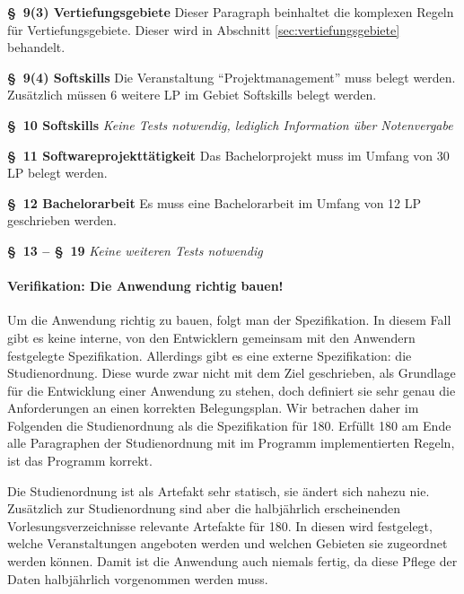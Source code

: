 \documentclass[ngerman]{article}
\begin{document}
\begin{paracol}{2}
\textbf{§~9(3) Vertiefungsgebiete}
\switchcolumn
Dieser Paragraph beinhaltet die komplexen Regeln für Vertiefungsgebiete.
Dieser wird in Abschnitt \ref{sec:vertiefungsgebiete} behandelt.
\\
\switchcolumn*

\textbf{§~9(4) Softskills}
\switchcolumn
Die Veranstaltung ``Projektmanagement'' muss belegt werden.
Zusätzlich müssen 6 weitere LP im Gebiet Softskills belegt werden.
\\
\switchcolumn*

\textbf{§~10 Softskills}
\switchcolumn
\emph{Keine Tests notwendig, lediglich Information über Notenvergabe}
\\
\switchcolumn*

\textbf{§~11 Softwareprojekttätigkeit}
\switchcolumn
Das Bachelorprojekt muss im Umfang von 30 LP belegt werden.
\\
\switchcolumn*

\textbf{§~12 Bachelorarbeit}
\switchcolumn
Es muss eine Bachelorarbeit im Umfang von 12 LP geschrieben werden.
\\
\switchcolumn*

\textbf{§~13 -- §~19}
\switchcolumn
\emph{Keine weiteren Tests notwendig}
\\
\switchcolumn*
\end{paracol}

\paragraph{Verifikation: Die Anwendung richtig bauen!}

Um die Anwendung richtig zu bauen, folgt man der Spezifikation.
In diesem Fall gibt es keine interne, von den Entwicklern gemeinsam mit den Anwendern festgelegte Spezifikation.
Allerdings gibt es eine externe Spezifikation: die Studienordnung.
Diese wurde zwar nicht mit dem Ziel geschrieben, als Grundlage für die Entwicklung einer Anwendung zu stehen, doch definiert sie sehr genau die Anforderungen an einen korrekten Belegungsplan.
Wir betrachen daher im Folgenden die Studienordnung als die Spezifikation für 180.
Erfüllt 180 am Ende alle Paragraphen der Studienordnung mit im Programm implementierten Regeln, ist das Programm korrekt.

Die Studienordnung ist als Artefakt sehr statisch, sie ändert sich nahezu nie.
Zusätzlich zur Studienordnung sind aber die halbjährlich erscheinenden Vorlesungsverzeichnisse relevante Artefakte für 180.
In diesen wird festgelegt, welche Veranstaltungen angeboten werden und welchen Gebieten sie zugeordnet werden können.
Damit ist die Anwendung auch niemals fertig, da diese Pflege der Daten halbjährlich vorgenommen werden muss.
\end{document}

